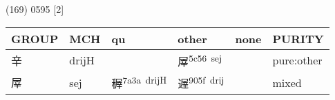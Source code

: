 \documentclass[14pt,a4paper]{scrartcl}
\begin{document}
(169) 0595 {[}2{]}

\begin{longtable}[c]{@{}llllll@{}}
\toprule
\begin{minipage}[b]{0.14\columnwidth}\raggedright\strut
GROUP
\strut\end{minipage} &
\begin{minipage}[b]{0.14\columnwidth}\raggedright\strut
MCH
\strut\end{minipage} &
\begin{minipage}[b]{0.14\columnwidth}\raggedright\strut
qu
\strut\end{minipage} &
\begin{minipage}[b]{0.14\columnwidth}\raggedright\strut
other
\strut\end{minipage} &
\begin{minipage}[b]{0.14\columnwidth}\raggedright\strut
none
\strut\end{minipage} &
\begin{minipage}[b]{0.14\columnwidth}\raggedright\strut
PURITY
\strut\end{minipage}\tabularnewline
\midrule
\endhead
\begin{minipage}[t]{0.14\columnwidth}\raggedright\strut
辛
\strut\end{minipage} &
\begin{minipage}[t]{0.14\columnwidth}\raggedright\strut
drijH
\strut\end{minipage} &
\begin{minipage}[t]{0.14\columnwidth}\raggedright\strut
\strut\end{minipage} &
\begin{minipage}[t]{0.14\columnwidth}\raggedright\strut
屖\textsuperscript{5c56~sej}
\strut\end{minipage} &
\begin{minipage}[t]{0.14\columnwidth}\raggedright\strut
\strut\end{minipage} &
\begin{minipage}[t]{0.14\columnwidth}\raggedright\strut
pure:other
\strut\end{minipage}\tabularnewline
\begin{minipage}[t]{0.14\columnwidth}\raggedright\strut
屖
\strut\end{minipage} &
\begin{minipage}[t]{0.14\columnwidth}\raggedright\strut
sej
\strut\end{minipage} &
\begin{minipage}[t]{0.14\columnwidth}\raggedright\strut
稺\textsuperscript{7a3a~drijH}
\strut\end{minipage} &
\begin{minipage}[t]{0.14\columnwidth}\raggedright\strut
遟\textsuperscript{905f~drij}
\strut\end{minipage} &
\begin{minipage}[t]{0.14\columnwidth}\raggedright\strut
\strut\end{minipage} &
\begin{minipage}[t]{0.14\columnwidth}\raggedright\strut
mixed
\strut\end{minipage}\tabularnewline
\bottomrule
\end{longtable}
\end{document}
